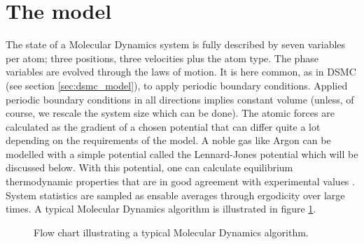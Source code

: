\section{The model}
\label{sec:md_model}
The state of a Molecular Dynamics system is fully described by seven variables per atom; three positions, three velocities plus the atom type. The phase variables are evolved through the laws of motion. It is here common, as in DSMC (see section \ref{sec:dsmc_model}), to apply periodic boundary conditions. Applied periodic boundary conditions in all directions implies constant volume (unless, of course, we rescale the system size which can be done). The atomic forces are calculated as the gradient of a chosen potential that can differ quite a lot depending on the requirements of the model. A noble gas like Argon can be modelled with a simple potential called the Lennard-Jones potential which will be discussed below. With this potential, one can calculate equilibrium thermodynamic properties that are in good agreement with experimental values \cite{verlet1967computer}. System statistics are sampled as ensable averages through ergodicity over large times. A typical Molecular Dynamics algorithm is illustrated in figure \ref{fig:flow_simple_md}.
\begin{figure}[h]
\centering
\caption{Flow chart illustrating a typical Molecular Dynamics algorithm.}
\label{fig:flow_simple_md}
\end{figure}